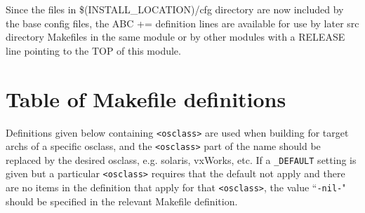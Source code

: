 Since the files in \$(INSTALL\_LOCATION)/cfg directory are now included by the base config files, the ABC += 
definition lines are available for use by later src directory Makefiles in the same module or by other modules with a 
RELEASE line pointing to the TOP of this module.

\section{Table of Makefile definitions}

Definitions given below containing \verb|<osclass>| are used when building for target archs of a specific osclass, and the 
\verb|<osclass>| part of the name should be replaced by the desired osclass, e.g. solaris, vxWorks, etc. If a \verb|_DEFAULT| setting is 
given but a particular \verb|<osclass>| requires that the default not apply and there are no items in the definition that apply for 
that \verb|<osclass>|, the value ``\verb|-nil-|" should be specified in the relevant Makefile definition.

